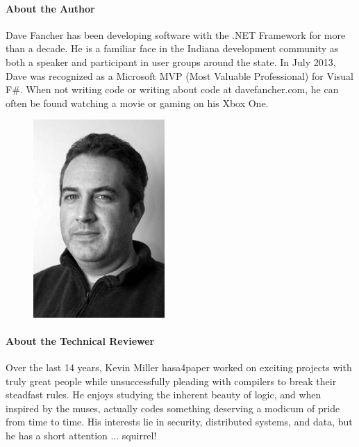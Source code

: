 \documentclass{book}
\begin{document}
\paragraph{\textbf{About the Author}}
Dave Fancher has been developing software with the .NET Framework for more than a decade. He is a familiar face in the Indiana development community as both a speaker and participant in user groups around the state. In July 2013, Dave was recognized as a Microsoft MVP (Most Valuable Professional) for Visual F\#. When not writing code or writing about code at davefancher.com, he can often be found watching a movie or gaming on his Xbox One.


\begin{figure}
  \includegraphics[width=5.0cm]{../pic/KevinMiller.png}
\end{figure}
\paragraph{\textbf{About the Technical Reviewer}}
Over the last 14 years, Kevin Miller hasa4paper worked on exciting projects with truly great people while unsuccessfully pleading with compilers to break their steadfast rules. He enjoys studying the inherent beauty of logic, and when inspired by the muses, actually codes something deserving a modicum of pride from time to time. His interests lie in security, distributed systems, and data, but he has a short attention ... squirrel!
\end{document}
